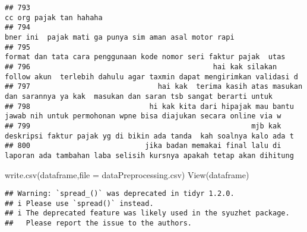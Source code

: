 \documentclass[
]{article}
\newenvironment{Shaded}{\begin{snugshade}}{\end{snugshade}}
\newcommand{\AttributeTok}[1]{\textcolor[rgb]{0.77,0.63,0.00}{#1}}
\newcommand{\CommentTok}[1]{\textcolor[rgb]{0.56,0.35,0.01}{\textit{#1}}}
\newcommand{\ConstantTok}[1]{\textcolor[rgb]{0.00,0.00,0.00}{#1}}
\newcommand{\FunctionTok}[1]{\textcolor[rgb]{0.00,0.00,0.00}{#1}}
\newcommand{\NormalTok}[1]{#1}
\newcommand{\OtherTok}[1]{\textcolor[rgb]{0.56,0.35,0.01}{#1}}
\newcommand{\SpecialCharTok}[1]{\textcolor[rgb]{0.00,0.00,0.00}{#1}}
\newcommand{\StringTok}[1]{\textcolor[rgb]{0.31,0.60,0.02}{#1}}
\begin{document}
\begin{verbatim}
## 793                                                                                                          cc org pajak tan hahaha
## 794                                                                           bner ini  pajak mati ga punya sim aman asal motor rapi
## 795                                                              format dan tata cara penggunaan kode nomor seri faktur pajak  utas 
## 796                                           hai kak silakan follow akun  terlebih dahulu agar taxmin dapat mengirimkan validasi d 
## 797                              hai kak  terima kasih atas masukan dan sarannya ya kak  masukan dan saran tsb sangat berarti untuk 
## 798                            hi kak kita dari hipajak mau bantu jawab nih untuk permohonan wpne bisa diajukan secara online via w 
## 799                                                    mjb kak deskripsi faktur pajak yg di bikin ada tanda  kah soalnya kalo ada t 
## 800                           jika badan memakai final lalu di laporan ada tambahan laba selisih kursnya apakah tetap akan dihitung
\end{verbatim}

\begin{Shaded}
\begin{Highlighting}[]
\FunctionTok{write.csv}\NormalTok{(dataframe,}\AttributeTok{file =} \StringTok{\textquotesingle{}dataPreprocessing.csv\textquotesingle{}}\NormalTok{)}
\FunctionTok{View}\NormalTok{(dataframe)}
\end{Highlighting}
\end{Shaded}

\begin{Shaded}
\end{Shaded}

\begin{verbatim}
## Warning: `spread_()` was deprecated in tidyr 1.2.0.
## i Please use `spread()` instead.
## i The deprecated feature was likely used in the syuzhet package.
##   Please report the issue to the authors.
\end{verbatim}
\end{document}
